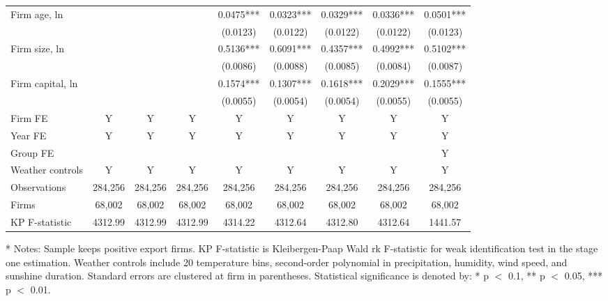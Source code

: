 \documentclass[12pt]{article}
\begin{document}
\begin{table}[H]
{\begin{tabular}{l*{8}{c}}
Firm age, ln            &       &      &        &0.0475***&0.0323***&0.0329***&0.0336***&0.0501***\\
                        &        &         &        &(0.0123) &(0.0122)&(0.0122)&(0.0122)&(0.0123)\\
Firm size, ln           &        &         &        &0.5136***&0.6091***&0.4357***&0.4992***&0.5102***\\
                        &        &         &        &(0.0086) &(0.0088)&(0.0085) &(0.0084)&(0.0087)\\
Firm capital, ln        &        &         &        &0.1574***&0.1307***&0.1618***&0.2029***&0.1555***\\
                        &        &         &        &(0.0055) &(0.0054)&(0.0054) &(0.0055)&(0.0055)\\
     \hline
    Firm FE  &Y&Y&Y&Y&Y&Y&Y&Y\\
    Year FE  &Y&Y&Y&Y&Y&Y&Y&Y\\
    Group FE &&&&&&&&Y\\
    Weather controls &Y&Y&Y&Y&Y&Y&Y&Y\\
    \hline
    Observations    &284,256&284,256&284,256&284,256&284,256&284,256&284,256&284,256\\
    Firms           &68,002 &68,002 &68,002 &68,002 &68,002&68,002 &68,002&68,002\\
    KP F-statistic	&4312.99&4312.99&4312.99&4314.22&4312.64&4312.80&4312.64&1441.57\\
    \hline\hline
    \end{tabular}
    }
    \begin{tablenotes}
    \item[*] \small Notes: Sample keeps positive export firms. KP F-statistic is Kleibergen-Paap Wald rk F-statistic for weak identification test in the stage one estimation. Weather controls include 20 temperature bins, second-order polynomial in precipitation, humidity, wind speed, and sunshine duration. Standard errors are clustered at firm in parentheses. Statistical significance is denoted by: * p $<$ 0.1, ** p $<$ 0.05, *** p $<$ 0.01.
    \end{tablenotes}
    \end{table}
\end{document}
